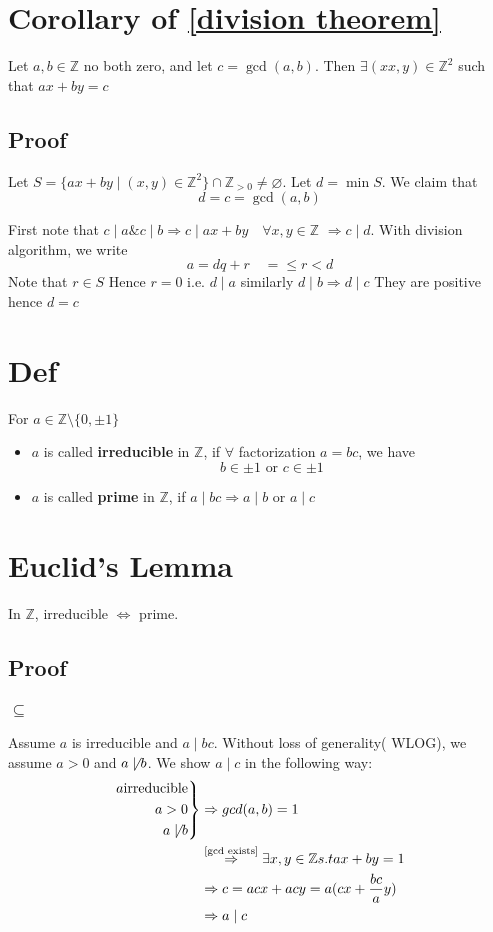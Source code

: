 \documentclass{book}
\begin{document}
\section{Corollary of \ref{division theorem}}
\label{gcd exists}
Let $a,b\in \mathbb{Z}$ no both zero, and let $c=\gcd(a,b)$. Then $\exists(xx,y)\in \mathbb{Z}^2$ such that $ax+by=c$
\subsection*{Proof}
Let $S=\{ax+by\mid(x,y)\in \mathbb{Z}^2\}\cap \mathbb{Z}_{> 0}\neq\varnothing$. Let $d=\min S$. We claim that $$d=c=\gcd(a,b)$$

First note that $c\mid a\& c\mid b$$\Rightarrow c\mid ax+by\quad \forall x,y\in \mathbb{Z}$ $\Rightarrow c\mid d$. With division algorithm, we write $$a=dq+r\quad =\leq r<d$$
Note that $r\in S$ Hence $r=0$ i.e. $d\mid a$ similarly $d\mid b\Rightarrow d\mid c$ They are positive hence $d=c$ 
\section{Def}For $a\in \mathbb{Z}\setminus\{0,\pm 1\}$\begin{itemize}
	\item $a$ is called \textbf{irreducible} in $\mathbb{Z}$, if $\forall$ factorization $a=bc$, we have $$b\in {\pm1}\text{ or }c\in {\pm1}$$
	\item $a$ is called \textbf{prime} in $\mathbb{Z}$, if $a\mid bc\Rightarrow a\mid b\text{ or }a\mid c$
\end{itemize}
\section{Euclid's Lemma}
\label{Euclid's Lemma}
In $\mathbb{Z}$, irreducible $\Leftrightarrow$ prime.
\subsection*{Proof}
\subsubsection{$\subseteq$}
Assume $a$ is irreducible and $a\mid bc$. Without loss of generality( WLOG), we assume $a>0$ and $a\not\mid b$. We show $a\mid c$ in the following way:
$$\begin{aligned}
	\left.\begin{aligned}
		a \text{irreducible}\\ a>0\\ a\not\mid b
	\end{aligned}\right\} &\Rightarrow gcd(a,b)=1\\
	&\stackrel{\text{\ref{gcd exists}}}{\Rightarrow} \exists x,y\in \mathbb{Z} s.t ax+by=1\\
	&\Rightarrow c=acx+acy=a(cx+\frac{bc}a y)\\
	&\Rightarrow a\mid c
\end{aligned}$$
\end{document}
